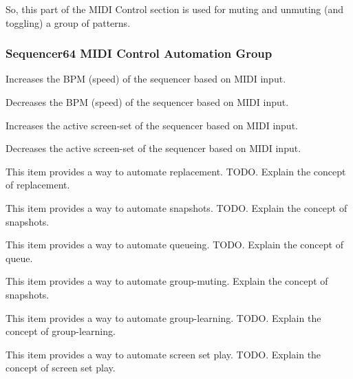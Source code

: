    So, this part of the MIDI Control section is used for muting and unmuting
   (and toggling) a group of patterns.

\subsubsection{Sequencer64 MIDI Control Automation Group}
\label{subsubsec:seq64_rc_file_midi_control_automation_group}


   \setcounter{ItemCounter}{0}      %

   Increases the BPM (speed) of the sequencer based on MIDI input.

   Decreases the BPM (speed) of the sequencer based on MIDI input.

   Increases the active screen-set of the sequencer based on MIDI input.

   Decreases the active screen-set of the sequencer based on MIDI input.

   This item provides a way to automate replacement.
   TODO.
   Explain the concept of replacement.

   This item provides a way to automate snapshots.
   TODO.
   Explain the concept of snapshots.

   This item provides a way to automate queueing.
   TODO.
   Explain the concept of queue.

   This item provides a way to automate group-muting.
   Explain the concept of snapshots.

   This item provides a way to automate group-learning.
   TODO.
   Explain the concept of group-learning.

   This item provides a way to automate screen set play.
   TODO.
   Explain the concept of screen set play.

